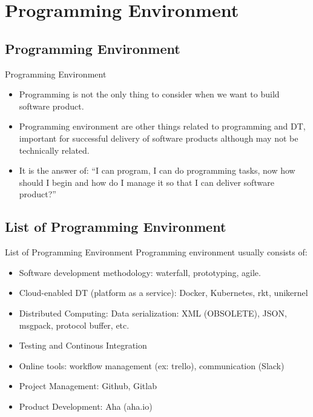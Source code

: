 \documentclass[10pt]{beamer}
\begin{document}
\section{Programming Environment}

  \subsection{Programming Environment}

    \begin{frame}[fragile]{Programming Environment}

      \begin{itemize} 
        \item Programming is not the only thing to consider when we want to build software product.
        \item Programming environment are other things related to programming and DT, important for successful delivery of software products although may not be technically related. 
        \item It is the answer of: “I can program, I can do programming tasks, now how should I begin and how do I manage it so that I can deliver software product?”
      \end{itemize}

    \end{frame}

  \subsection{List of Programming Environment}

    \begin{frame}[fragile]{List of Programming Environment}
        Programming environment usually consists of:
          \begin{itemize}
            \item Software development methodology: waterfall, prototyping, agile.
            \item Cloud-enabled DT (platform as a service): Docker, Kubernetes, rkt, unikernel
            \item Distributed Computing: Data serialization: XML (OBSOLETE), JSON, msgpack, protocol buffer, etc.
            \item Testing and Continous Integration
            \item Online tools: workflow management (ex: trello), communication (Slack)
            \item Project Management: Github, Gitlab 
            \item Product Development: Aha (aha.io)
          \end{itemize}
    \end{frame}
\end{document}
